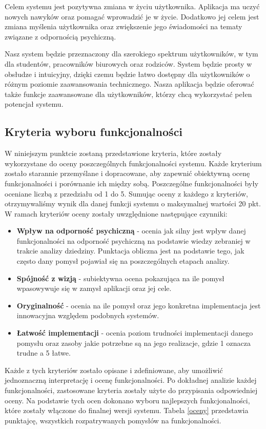 Celem systemu jest pozytywna zmiana w życiu użytkownika. Aplikacja ma uczyć
nowych nawyków oraz pomagać wprowadzić je w życie. Dodatkowo jej celem jest
zmiana myślenia użytkownika oraz zwiększenie jego świadomości na tematy związane
z odpornością psychiczną.

Nasz system będzie przeznaczony dla szerokiego spektrum użytkowników, w tym dla
studentów, pracowników biurowych oraz rodziców. System będzie prosty w obsłudze
i intuicyjny, dzięki czemu będzie łatwo dostępny dla użytkowników o różnym
poziomie zaawansowania technicznego. Nasza aplikacja będzie oferować także
funkcje zaawansowane dla użytkowników, którzy chcą wykorzystać pełen potencjał
systemu.

\subsection{Kryteria wyboru funkcjonalności}
W niniejszym punktcie zostaną przedstawione kryteria, które zostały wykorzystane
do oceny poszczególnych funkcjonalności systemu. Każde kryterium zostało
starannie przemyślane i dopracowane, aby zapewnić obiektywną ocenę
funkcjonalności i porównanie ich między sobą. Poszczególne funkcjonalności były
oceniane liczbą z przedziału od 1 do 5. Sumując oceny z każdego z kryteriów,
otrzymywaliśmy wynik dla danej funkcji systemu o maksymalnej wartości 20 pkt. W
ramach kryteriów oceny zostały uwzględnione następujące czynniki:
\begin{itemize}
    \item \textbf{Wpływ na odporność psychiczną} - ocenia jak silny jest wpływ
          danej funkcjonalności na odporność psychiczną na podstawie wiedzy
          zebraniej w trakcie analizy dziedziny. Punktacja obliczna jest na
          podstawie tego, jak często dany pomysł pojawiał się na poszczególnych
          etapach analizy.
    \item \textbf{Spójność z wizją} - subiektywna ocena pokazująca na ile pomysł
          wpasowywuje się w zamysł aplikacji oraz jej cele.
    \item \textbf{Oryginalność} - ocenia na ile pomysł oraz jego konkretna
          implementacja jest innowacyjna względem podobnych systemów.
    \item \textbf{Łatwość implementacji} - ocenia poziom trudności implementacji
          danego pomysłu oraz zasoby jakie potrzebne są na jego realizacje,
          gdzie 1 oznacza trudne a 5 łatwe.
\end{itemize}
Każde z tych kryteriów zostało opisane i zdefiniowane, aby umożliwić
jednoznaczną interpretację i ocenę funkcjonalności. Po dokładnej analizie każdej
funkcjonalności, zastosowane kryteria zostały użyte do przypisania odpowiedniej
oceny. Na podstawie tych ocen dokonano wyboru najlepszych funkcjonalności, które
zostały włączone do finalnej wersji systemu. Tabela \ref{oceny} przedstawia
punktajcę, wszystkich rozpatrywanych pomysłów na funkcjonalności.

